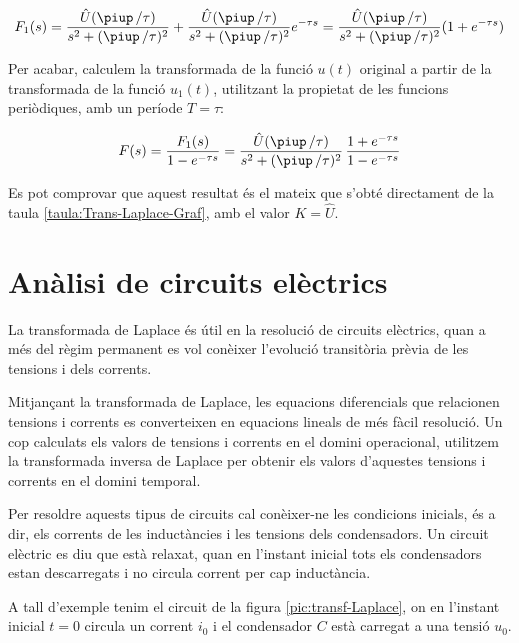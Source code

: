 \begin{exemple}[\CalcTransfLaplace{}]
    \[
        F_1(s) = \frac{\hat{U} (\piup\,/\tau)}{s^2 + (\piup\,/\tau)^2} +
        \frac{\hat{U} (\piup\,/\tau)}{s^2 + (\piup\,/\tau)^2} e^{-\tau s} =
        \frac{\hat{U} (\piup\,/\tau)}{s^2 + (\piup\,/\tau)^2} (1+e^{-\tau s})
    \]

    Per acabar, calculem la transformada de la funció $u(t)$ original a
    partir de la transformada de la funció $u_1(t)$, utilitzant la
    propietat de les funcions periòdiques, amb un període $T=\tau$:

    \[
        F(s) = \frac{F_1(s)}{1-e^{-\tau s}} =
        \frac{\hat{U} (\piup\,/\tau) }{s^2 + (\piup\,/\tau)^2}\,\frac{1+e^{-\tau s}}{1-e^{-\tau
        s}}
    \]

    Es pot comprovar que aquest resultat és el mateix que s'obté directament de la taula \vref{taula:Trans-Laplace-Graf}, amb el valor $K=\hat{U}$.
\end{exemple}

\section{Anàlisi de circuits elèctrics}

La transformada de Laplace és útil en la resolució de circuits
elèctrics, quan a més del règim permanent es vol conèixer
l'evolució transitòria prèvia de les tensions i dels corrents.

Mitjançant la transformada de Laplace, les equacions diferencials
que relacionen tensions i corrents es converteixen en equacions
lineals de més fàcil resolució. Un cop calculats els valors de
tensions i corrents en el domini operacional, utilitzem la
transformada inversa de Laplace per obtenir els valors d'aquestes
tensions i corrents en el domini temporal.

Per  resoldre aquests tipus de circuits cal conèixer-ne les
condicions inicials, és a dir, els corrents de les inductàncies i
les tensions dels condensadors. Un circuit elèctric es diu que està
relaxat, quan en l'instant inicial tots els condensadors estan
descarregats i no circula corrent per cap inductància.

A tall d'exemple tenim el circuit de la figura
\vref{pic:transf-Laplace}, on en l'instant inicial $t=0$ circula un
corrent $i_0$ i el condensador $C$ està carregat a una tensió $u_0$.

\begin{center}
    
    \label{pic:transf-Laplace}
\end{center}

